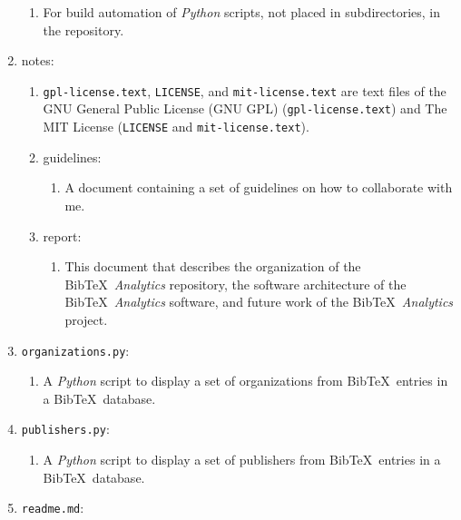 \begin{enumerate}
	\begin{enumerate} \itemsep -2pt
	\item For build automation of {\it Python} scripts, not placed in subdirectories, in the repository.
	\end{enumerate}
\item notes: \vspace{-0.3cm}
	\begin{enumerate} \itemsep -2pt
	\item {\tt gpl-license.text}, {\tt LICENSE}, and {\tt mit-license.text} are text files of the GNU General Public License (GNU GPL) ({\tt gpl-license.text}) and The MIT License ({\tt LICENSE} and {\tt mit-license.text}).
	\item guidelines: \vspace{-0.2cm}
		\begin{enumerate} \itemsep -2pt
		\item A document containing a set of guidelines on how to collaborate with me.
		\end{enumerate}
	\item report: \vspace{-0.2cm}
		\begin{enumerate} \itemsep -2pt
		\item This document that describes the organization of the {\sc Bib}\TeX\ {\it Analytics} repository, the software architecture of the {\sc Bib}\TeX\ {\it Analytics} software, and future work of the {\sc Bib}\TeX\ {\it Analytics} project.
		\end{enumerate}
	\end{enumerate}
\item {\tt organizations.py}: \vspace{-0.3cm}
	\begin{enumerate} \itemsep -2pt
	\item A {\it Python} script to display a set of organizations from {\sc Bib}\TeX\ entries in a {\sc Bib}\TeX\ database.
	\end{enumerate}
\item {\tt publishers.py}: \vspace{-0.3cm}
	\begin{enumerate} \itemsep -2pt
	\item A {\it Python} script to display a set of publishers from {\sc Bib}\TeX\ entries in a {\sc Bib}\TeX\ database.
	\end{enumerate}
\item {\tt readme.md}: \vspace{-0.3cm}

\end{enumerate}
